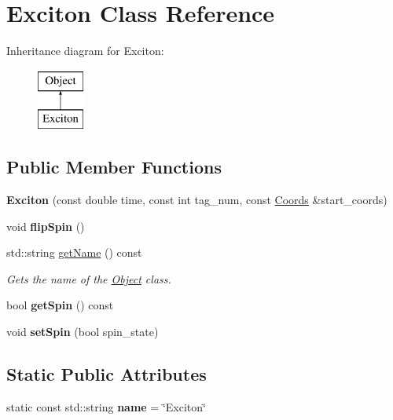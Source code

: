 \hypertarget{class_exciton}{}\section{Exciton Class Reference}
\label{class_exciton}
Inheritance diagram for Exciton\+:\begin{figure}[H]
\begin{center}
\leavevmode
\includegraphics[height=2.000000cm]{class_exciton}
\end{center}
\end{figure}
\subsection*{Public Member Functions}
\begin{DoxyCompactItemize}
\item 
\mbox{\label{class_exciton_a105a259c1235f22972cd25d811a750e7}} 
{\bfseries Exciton} (const double time, const int tag\+\_\+num, const \hyperlink{struct_coords}{Coords} \&start\+\_\+coords)
\item 
\mbox{\label{class_exciton_a85a7b8561f6e294593679e53dd3b91a9}} 
void {\bfseries flip\+Spin} ()
\item 
std\+::string \hyperlink{class_exciton_a4db43bd7ca4136e35f9a50b2a5854728}{get\+Name} () const
\begin{DoxyCompactList}\small\item\em Gets the name of the \hyperlink{class_object}{Object} class. \end{DoxyCompactList}\item 
\mbox{\label{class_exciton_a91cb4c59b7e7a7fb756aae4c4109dba3}} 
bool {\bfseries get\+Spin} () const
\item 
\mbox{\label{class_exciton_ac4c632e42b902209de783fde48d74269}} 
void {\bfseries set\+Spin} (bool spin\+\_\+state)
\end{DoxyCompactItemize}
\subsection*{Static Public Attributes}
\begin{DoxyCompactItemize}
\item 
\mbox{\label{class_exciton_a455155f7d0a91a1ada55b64cf25b3405}} 
static const std\+::string {\bfseries name} = \char`\"{}Exciton\char`\"{}
\end{DoxyCompactItemize}


